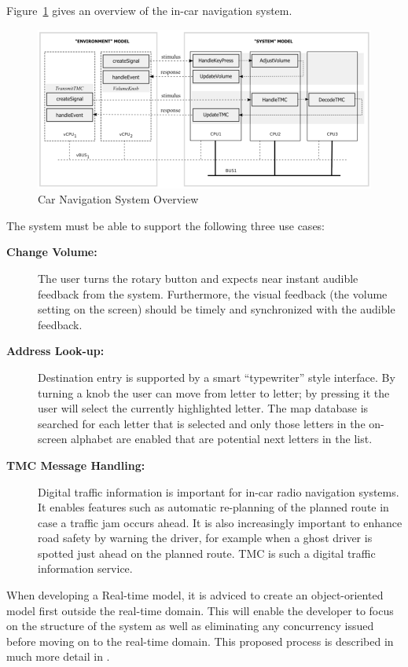 Figure~\ref{fig:navigationoverview} gives an overview of the in-car navigation system. 

\begin{figure}[!h]
\begin{center}
  \includegraphics[width=4.5in]{figures/CarNavigationOverview}
  \caption[labelInTOC]{Car Navigation System Overview}
  \label{fig:navigationoverview}
\end{center}
\end{figure}

The system must be able to support the following three use cases:

\begin{description}
\item[\textbf{Change Volume:}] The user turns the rotary button and expects near instant audible feedback from the system. Furthermore, the visual feedback
(the volume setting on the screen) should be timely and synchronized with the
audible feedback.
\item[\textbf{Address Look-up:}] Destination entry is supported by a smart ``typewriter'' style interface. By turning a knob the user can move from letter to letter; by pressing it the user will select the currently highlighted letter. The map database is searched for each letter that is selected and only those letters in the on-screen alphabet are enabled that are potential next letters in the list.
\item[\textbf{TMC Message Handling:}] Digital traffic information is important for in-car radio navigation systems. It enables features such as automatic re-planning of the planned route in case a traffic jam occurs ahead. It is also increasingly important to enhance road safety by warning the driver, for example when a ghost driver is spotted just ahead on the planned route. TMC is such a digital traffic information service.
\end{description}

When developing a Real-time model, it is adviced to create an object-oriented model first outside the real-time domain. This will enable the developer to focus on the structure of the system as well as eliminating any concurrency issued before moving on to the real-time domain. This proposed process is described in much more detail in \cite{Larsen&09b}.

